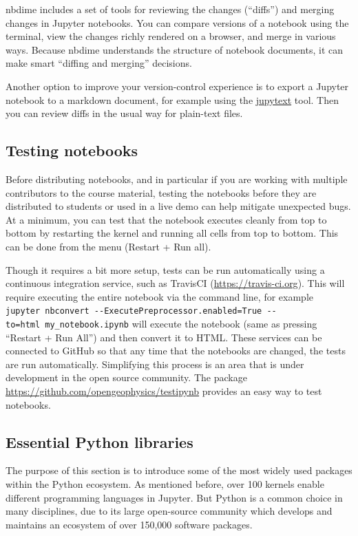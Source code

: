 \documentclass[]{book}
\begin{document}
nbdime includes a set of tools for reviewing the changes (``diffs'') and
merging changes in Jupyter notebooks. You can compare versions of a
notebook using the terminal, view the changes richly rendered on a
browser, and merge in various ways. Because nbdime understands the
structure of notebook documents, it can make smart ``diffing and
merging'' decisions.

Another option to improve your version-control experience is to export a
Jupyter notebook to a markdown document, for example using the
\href{https://github.com/mwouts/jupytext}{jupytext} tool. Then you can
review diffs in the usual way for plain-text files.

\subsection{Testing notebooks}\label{testing-notebooks}

Before distributing notebooks, and in particular if you are working with
multiple contributors to the course material, testing the notebooks
before they are distributed to students or used in a live demo can help
mitigate unexpected bugs. At a minimum, you can test that the notebook
executes cleanly from top to bottom by restarting the kernel and running
all cells from top to bottom. This can be done from the menu (Restart +
Run all).

Though it requires a bit more setup, tests can be run automatically
using a continuous integration service, such as TravisCI
(\url{https://travis-ci.org}). This will require executing the entire
notebook via the command line, for example
\texttt{jupyter\ nbconvert\ -\/-ExecutePreprocessor.enabled=True\ -\/-to=html\ my\_notebook.ipynb}
will execute the notebook (same as pressing ``Restart + Run All'') and
then convert it to HTML. These services can be connected to GitHub so
that any time that the notebooks are changed, the tests are run
automatically. Simplifying this process is an area that is under
development in the open source community. The package
\url{https://github.com/opengeophysics/testipynb} provides an easy way
to test notebooks.

\subsection{Essential Python
libraries}\label{essential-python-libraries}

The purpose of this section is to introduce some of the most widely used
packages within the Python ecosystem. As mentioned before, over 100
kernels enable different programming languages in Jupyter. But Python is
a common choice in many disciplines, due to its large open-source
community which develops and maintains an ecosystem of over 150,000
software packages.
\end{document}
